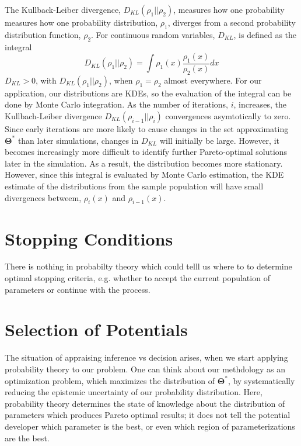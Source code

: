 The Kullback-Leiber divergence\cite{kullback1951_kld}, $D_{KL}(\rho_1\vert\vert\rho_2)$, measures how one probability measures how one probability distribution, $\rho_1$, diverges from a second probability distribution function, $\rho_2$.
For continuous random variables, $D_{KL}$, is defined as the integral
\begin{equation}
   D_{KL}(\rho_1\vert\vert\rho_2)=\int \rho_1(x) \frac{\rho_1(x)}{\rho_2(x)}dx
\end{equation}
$D_{KL} > 0$, with $D_{KL}(\rho_1\vert\vert\rho_2)$, when $\rho_1=\rho_2$ almost everywhere.
For our application, our distributions are KDEs, so the evaluation of the integral can be done by Monte Carlo integration.
As the number of iterations, $i$, increases, the Kullbach-Leiber divergence $D_{KL}(\rho_{i-1}\vert\vert\rho_i)$ convergences asymtotically to zero.
Since early iterations are more likely to cause changes in the set approximating $\bm{\Theta}^*$ than later simulations, changes in $D_{KL}$ will initially be large.
However, it becomes increasingly more difficult to identify further Pareto-optimal solutions later in the simulation.
As a result, the distribution becomes more stationary.
However, since this integral is evaluated by Monte Carlo estimation, the KDE estimate of the distributions from the sample population will have small divergences betweem, $\rho_i(x)$ and $\rho_{i-1}(x)$.

\section{Stopping Conditions}

There is nothing in probabilty theory which could telll us where to to determine optimal stopping criteria, e.g. whether to accept the current population of parameters or continue with the process.

\section{Selection of Potentials}

The situation of appraising inference vs decision arises, when we start applying probability theory to our problem.  One can think about our methdology as an optimization problem, which maximizes the distribution of $\bm{\Theta}^*$, by systematically reducing the epistemic uncertainty of our probability distribution.  Here, probability theory determines the state of knowledge about the distribution of parameters which produces Pareto optimal results; it does not tell the potential developer which parameter is the best, or even which region of parameterizations are the best.

